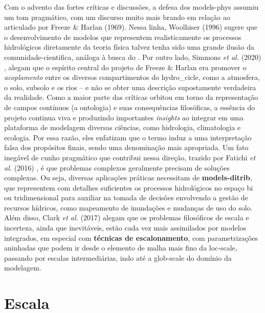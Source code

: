 \documentclass[./main.tex]{subfiles}
\begin{document}
\par Com o advento das fortes críticas e discussões, a defesa dos \gls{models-phys} assumiu um tom pragmático, com um discurso muito mais brando em relação ao articulado por Freeze \& Harlan (1969). Nessa linha, Woolhiser (1996) \cite{Woolhiser1996a} sugere que o desenvolvimento de modelos que representem realisticamente os processos hidrológicos diretamente da \gls{teoria} física talvez tenha sido uma grande ilusão da \gls{comunidade-cientifica}, análoga à busca do . Por outro lado, Simmons \textit{et al.} (2020) \cite{Simmons2020a}, alegam que o espírito central do projeto de Freeze \& Harlan era promover o \textit{acoplamento} entre os diversos compartimentos do \gls{hydro_cicle}, como a atmosfera, o solo, subsolo e os rios -- e não se obter uma descrição supostamente verdadeira da realidade. Como a maior parte das críticas orbitou em torno da representação de campos contínuos (a ontologia) e suas consequências filosóficas, a essência do projeto continua viva e produzindo importantes \textit{insights} ao integrar em uma plataforma de modelagem diversas ciências, como hidrologia, climatologia e ecologia. Por essa razão, eles enfatizam que o termo  induz a uma interpretação falsa dos propósitos finais, sendo  uma denominação mais apropriada. Um fato inegável de cunho pragmático que contribui nessa direção, trazido por Fatichi \textit{et al.} (2016) \cite{Fatichi2016a}, é que problemas complexos geralmente precisam de soluções complexas. Ou seja, diversas aplicações práticas necessitam de \textbf{\gls{models-ditrib}}, que representem com detalhes suficientes os processos hidrológicos no espaço bi ou tridimensional para auxiliar na tomada de decisões envolvendo a gestão de recursos hídricos, como mapeamento de inundações e mudanças de uso do solo. Além disso, Clark \textit{et al.} (2017) \cite{Clark2017a} alegam que os problemas filosóficos de escala e incerteza, ainda que inevitáveis, estão cada vez mais assimilados por modelos integrados, em especial com \textbf{técnicas de escalonamento}, com parametrizações aninhadas que podem ir desde o elemento de malha mais fino da \gls{loc-scale}, passando por escalas intermediárias, indo até a \gls{glob-scale} do domínio da modelagem.
 
\section{Escala} \label{sec:hydro:sim}
\end{document}
